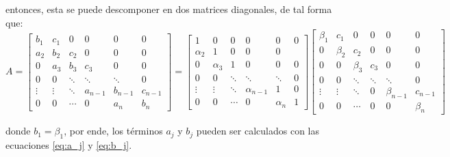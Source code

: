 entonces, esta se puede descomponer en dos matrices diagonales, de tal forma que:
\scriptsize
\begin{equation}
    A = \begin{bmatrix}
        b_1    & c_1    & 0      & 0       & 0       & 0       \\
        a_2    & b_2    & c_2    & 0       & 0       & 0       \\
        0      & a_3    & b_3    & c_3     & 0       & 0       \\
        0      & 0      & \ddots & \ddots  & \ddots  & 0       \\
        \vdots & \vdots & \ddots & a_{n-1} & b_{n-1} & c_{n-1} \\
        0      & 0      & \cdots & 0       & a_n     & b_n
    \end{bmatrix} =
    \begin{bmatrix}
        1        & 0        & 0      & 0            & 0        & 0 \\
        \alpha_2 & 1        & 0      & 0            & 0            \\
        0        & \alpha_3 & 1      & 0            & 0        & 0 \\
        0        & 0        & \ddots & \ddots       & \ddots   & 0 \\
        \vdots   & \vdots   & \ddots & \alpha_{n-1} & 1        & 0 \\
        0        & 0        & \cdots & 0            & \alpha_n & 1
    \end{bmatrix}\begin{bmatrix}
        \beta_1 & c_1     & 0       & 0      & 0           & 0       \\
        0       & \beta_2 & c_2     & 0      & 0           & 0       \\
        0       & 0       & \beta_3 & c_3    & 0           & 0       \\
        0       & 0       & \ddots  & \ddots & \ddots      & 0       \\
        \vdots  & \vdots  & \ddots  & 0      & \beta_{n-1} & c_{n-1} \\
        0       & 0       & \cdots  & 0      & 0           & \beta_n
    \end{bmatrix}
\end{equation}
\normalsize

donde $b_1 = \beta_1$, por ende, los términos $a_j$ y $b_j$ pueden ser calculados con las ecuaciones \ref{eq:a_j} y \ref{eq:b_j}.

